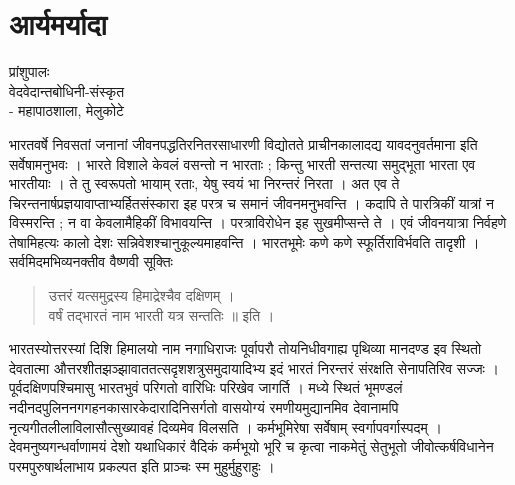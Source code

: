 {\fontsize{15}{17}\selectfont
\chapter{आर्यमर्यादा}

\begin{center}
\smallskip

प्रांशुपालः\\
वेदवेदान्तबोधिनी-संस्कृत\\
- महापाठशाला, मेलुकोटे
\addrule
\end{center}

भारतवर्षे निवसतां जनानां जीवनपद्धतिरनितरसाधारणी विद्योतते प्राचीनकालादद्य यावदनुवर्तमाना इति सर्वेषामनुभवः । भारते विशाले केवलं वसन्तो न भारताः ; किन्तु भारती सन्तत्या समुद्भूता भारता एव भारतीयाः । ते तु स्वरूपतो भायाम् रताः, येषु स्वयं भा निरन्तरं निरता । अत एव ते चिरन्तनार्षप्रज्ञयावाप्ताभ्यर्हितसंस्कारा इह परत्र च समानं जीवनमनुभवन्ति । कदापि ते पारत्रिकीं यात्रां न विस्मरन्ति ; न वा केवलामैहिकीं विभावयन्ति । परत्राविरोधेन इह सुखमीप्सन्ते ते । एवं जीवनयात्रा निर्वहणे तेषामिहत्यः कालो देशः सन्निवेशश्चानुकूल्यमाहवन्ति । भारतभूमेः कणे कणे स्फूर्तिराविर्भवति तादृशी । सर्वमिदमभिव्यनक्तीव वैष्णवी सूक्तिः 
\begin{verse}
उत्तरं यत्समुद्रस्य हिमाद्रेश्चैव दक्षिणम् ।\\
वर्षं तद्भारतं नाम भारती यत्र सन्ततिः ॥ इति ।
\end{verse}
भारतस्योत्तरस्यां दिशि हिमालयो नाम नगाधिराजः पूर्वापरौ तोयनिधीवगाह्य पृथिव्या मानदण्ड इव स्थितो देवतात्मा औत्तरशीतझञ्झावाततत्सदृशशत्रुसमुदायादिभ्य इदं भारतं निरन्तरं संरक्षति सेनापतिरिव सज्जः । पूर्वदक्षिणपश्चिमासु भारतभुवं परिगतो वारिधिः परिखेव जागर्ति । मध्ये स्थितं  भूमण्डलं नदीनदपुलिननगगहनकासारकेदारादिनिसर्गतो वासयोग्यं रमणीयमुद्यानमिव देवानामपि नृत्यगीतलीलाविलासौत्सुख्यावहं दिव्यमेव विलसति । कर्मभूमिरेषा सर्वेषाम् स्वर्गापवर्गास्पदम् । देवमनुष्यगन्धर्वाणामयं देशो यथाधिकारं वैदिकं कर्मभूयो भूरि च कृत्वा नाकमेतुं सेतुभूतो जीवोत्कर्षविधानेन परमपुरुषार्थलाभाय प्रकल्पत इति प्राञ्चः स्म मुहुर्मुहुराहुः ।

}
